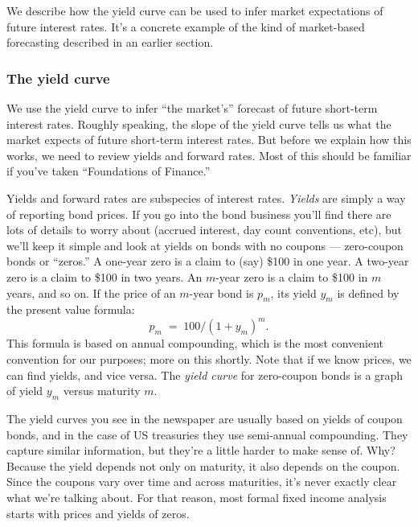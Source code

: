 \documentclass[letterpaper,12pt]{article}
\begin{document}
\bigskip
We describe how the yield curve can be used to infer
market expectations of future interest rates.
It's a concrete example of the kind of market-based forecasting
described in an earlier section.


\subsubsection*{The yield curve}

We use the yield curve to infer ``the
market's'' forecast of future short-term interest rates.  
Roughly speaking, the slope of
the yield curve tells us what the market expects of future
short-term interest rates. But before we explain how this works,
we need to review yields and forward rates.
Most of this should be familiar if you've taken 
``Foundations of Finance.''  

Yields and forward rates are subspecies of interest rates. {\it
Yields\/} are simply a way of reporting bond prices. If you go
into the bond business you'll find there are lots of details to
worry about (accrued interest, day count conventions, etc), but
we'll keep it simple and look at yields on bonds with no coupons
--- zero-coupon bonds or ``zeros.''  A one-year zero is a claim to (say) \$100 in
one year.  A two-year zero is a claim to \$100 in two years.  An
$m$-year zero is a claim to \$100 in $m$ years, and so on.  If the
price of an $m$-year bond is $p_m$, its yield $y_m$ is defined by
the present value formula:
\begin{equation}
        p_m  \;=\; 100/(1+y_m)^m.
        \label{eq:pv}
\end{equation}
This formula is based on annual compounding, which is the most
convenient convention for our purposes; more on this shortly. Note
that if we know prices, we can find yields, and vice versa. The
{\it yield curve\/} for zero-coupon bonds is a graph of yield
$y_m$ versus maturity $m$.


The yield curves you see in the newspaper are usually based on
yields of coupon bonds, and in the case of US treasuries they use
semi-annual compounding. They capture similar information, but
they're a little harder to make sense of.  Why?  Because the yield
depends not only on maturity, it also depends on the coupon. Since
the coupons vary over time and across maturities, it's never
exactly clear what we're talking about.  For that reason, most
formal fixed income analysis starts with prices and yields of
zeros.
\end{document}
